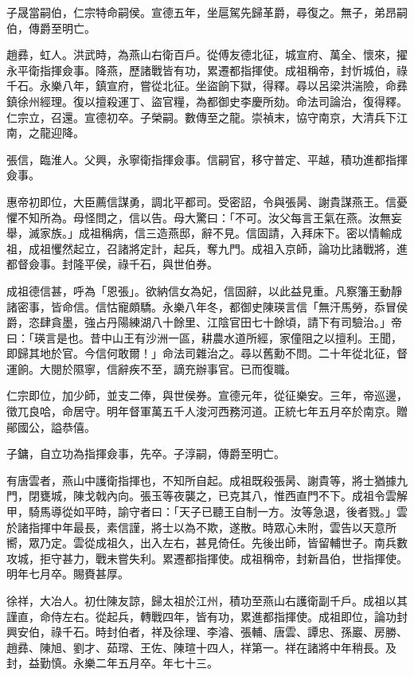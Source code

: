 \begin{pinyinscope}
子晟當嗣伯，仁宗特命嗣侯。宣德五年，坐扈駕先歸革爵，尋復之。無子，弟昂嗣伯，傳爵至明亡。

趙彞，虹人。洪武時，為燕山右衛百戶。從傅友德北征，城宣府、萬全、懷來，擢永平衛指揮僉事。降燕，歷諸戰皆有功，累遷都指揮使。成祖稱帝，封忻城伯，祿千石。永樂八年，鎮宣府，嘗從北征。坐盜餉下獄，得釋。尋以呂梁洪湍險，命彞鎮徐州經理。復以擅殺運丁、盜官糧，為都御史李慶所劾。命法司論治，復得釋。仁宗立，召還。宣德初卒。子榮嗣。數傳至之龍。崇禎末，協守南京，大清兵下江南，之龍迎降。

張信，臨淮人。父興，永寧衛指揮僉事。信嗣官，移守普定、平越，積功進都指揮僉事。

惠帝初即位，大臣薦信謀勇，調北平都司。受密詔，令與張昺、謝貴謀燕王。信憂懼不知所為。母怪問之，信以告。母大驚曰：「不可。汝父每言王氣在燕。汝無妄舉，滅家族。」成祖稱病，信三造燕邸，辭不見。信固請，入拜床下。密以情輸成祖，成祖戄然起立，召諸將定計，起兵，奪九門。成祖入京師，論功比諸戰將，進都督僉事。封隆平侯，祿千石，與世伯券。

成祖德信甚，呼為「恩張」。欲納信女為妃，信固辭，以此益見重。凡察籓王動靜諸密事，皆命信。信怙寵頗驕。永樂八年冬，都御史陳瑛言信「無汗馬勞，忝冒侯爵，恣肆貪墨，強占丹陽練湖八十餘里、江陰官田七十餘頃，請下有司驗治。」帝曰：「瑛言是也。昔中山王有沙洲一區，耕農水道所經，家僮阻之以擅利。王聞，即歸其地於官。今信何敢爾！」命法司雜治之。尋以舊勳不問。二十年從北征，督運餉。大閱於隰寧，信辭疾不至，謫充辦事官。已而復職。

仁宗即位，加少師，並支二俸，與世侯券。宣德元年，從征樂安。三年，帝巡邊，徵兀良哈，命居守。明年督軍萬五千人浚河西務河道。正統七年五月卒於南京。贈鄖國公，謚恭僖。

子鏞，自立功為指揮僉事，先卒。子淳嗣，傳爵至明亡。

有唐雲者，燕山中護衛指揮也，不知所自起。成祖既殺張昺、謝貴等，將士猶據九門，閉甕城，陳戈戟內向。張玉等夜襲之，已克其八，惟西直門不下。成祖令雲解甲，騎馬導從如平時，諭守者曰：「天子已聽王自制一方。汝等急退，後者戮。」雲於諸指揮中年最長，素信謹，將士以為不欺，遂散。時眾心未附，雲告以天意所嚮，眾乃定。雲從成祖久，出入左右，甚見倚任。先後出師，皆留輔世子。南兵數攻城，拒守甚力，戰未嘗失利。累遷都指揮使。成祖稱帝，封新昌伯，世指揮使。明年七月卒。賜賚甚厚。

徐祥，大冶人。初仕陳友諒，歸太祖於江州，積功至燕山右護衛副千戶。成祖以其謹直，命侍左右。從起兵，轉戰四年，皆有功，累進都指揮使。成祖即位，論功封興安伯，祿千石。時封伯者，祥及徐理、李濬、張輔、唐雲、譚忠、孫巖、房勝、趙彞、陳旭、劉才、茹瑺、王佐、陳瑄十四人，祥第一。祥在諸將中年稍長。及封，益勤慎。永樂二年五月卒。年七十三。


\end{pinyinscope}
